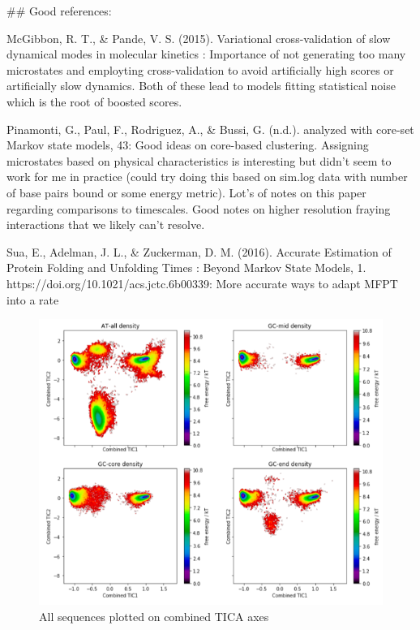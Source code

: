 \documentclass[journal=jpcbfk,manuscript=article]{achemso}
\begin{document}
## Good references:

McGibbon, R. T., & Pande, V. S. (2015). Variational cross-validation of slow dynamical modes in molecular kinetics : Importance of not generating too many microstates and employting cross-validation to avoid artificially high scores or artificially slow dynamics. Both of these lead to models fitting statistical noise which is the root of boosted scores.

Pinamonti, G., Paul, F., Rodriguez, A., & Bussi, G. (n.d.). analyzed with core-set Markov state models, 43: Good ideas on core-based clustering. Assigning microstates based on physical characteristics is interesting but didn't seem to work for me in practice (could try doing this based on sim.log data with number of base pairs bound or some energy metric). Lot's of notes on this paper regarding comparisons to timescales. Good notes on higher resolution fraying interactions that we likely can't resolve.

Sua, E., Adelman, J. L., & Zuckerman, D. M. (2016). Accurate Estimation of Protein Folding and Unfolding Times : Beyond Markov State Models, 1. https://doi.org/10.1021/acs.jctc.6b00339:
More accurate ways to adapt MFPT into a rate


\begin{figure}[ht!]
	\begin{center}
        \includegraphics[width=\textwidth]{Figs/figs_0804/all_seq_tica_cvs.PNG}
        \caption{All sequences plotted on combined TICA axes}
        \label{fig:all_seq_tica_cvs}
	\end{center}
\end{figure}
\end{document}
